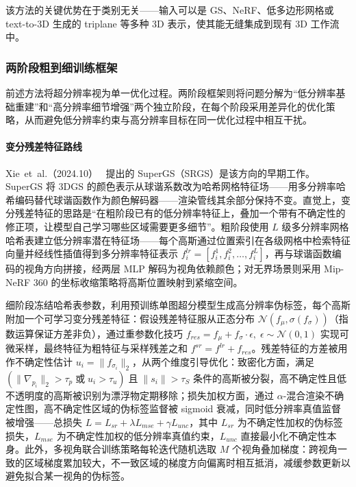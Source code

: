 该方法的关键优势在于类别无关——输入可以是 GS、NeRF、低多边形网格或 text-to-3D 生成的 triplane 等多种 3D 表示，使其能无缝集成到现有 3D 工作流中。

\subsubsection{两阶段粗到细训练框架}

前述方法将超分辨率视为单一优化过程。两阶段框架则将问题分解为“低分辨率基础重建”和“高分辨率细节增强”两个独立阶段，在每个阶段采用差异化的优化策略，从而避免低分辨率约束与高分辨率目标在同一优化过程中相互干扰。

\paragraph{变分残差特征路线}

Xie~et~al.（2024.10）~\cite{2410_02571} 提出的 SuperGS（SRGS）是该方向的早期工作。SuperGS 将 3DGS 的颜色表示从球谐系数改为哈希网格特征场——用多分辨率哈希编码替代球谐函数作为颜色解码器——渲染管线其余部分保持不变。直觉上，变分残差特征的思路是“在粗阶段已有的低分辨率特征上，叠加一个带有不确定性的修正项，让模型自己学习哪些区域需要更多细节”。粗阶段使用 $L$ 级多分辨率网格哈希表建立低分辨率潜在特征场——每个高斯通过位置索引在各级网格中检索特征向量并经线性插值得到多分辨率特征表示 $f^{lr}_i = [f_i^1, f_i^2, \ldots, f_i^L]$，再与球谐函数编码的视角方向拼接，经两层 MLP 解码为视角依赖颜色；对无界场景则采用 Mip-NeRF 360 的坐标收缩策略将高斯位置映射到紧缩空间。

细阶段冻结哈希表参数，利用预训练单图超分模型生成高分辨率伪标签，每个高斯附加一个可学习变分残差特征：假设残差特征服从正态分布 $\mathcal{N}(f_\mu, \sigma(f_\sigma))$（指数运算保证方差非负），通过重参数化技巧 $f_{res} = f_\mu + f_\sigma \cdot \epsilon,\; \epsilon \sim \mathcal{N}(0,1)$ 实现可微采样，最终特征为粗特征与采样残差之和 $f^{sr} = f^{lr} + f_{res}$。残差特征的方差被用作不确定性估计 $u_i = \|f_{\sigma_i}\|_2$，从两个维度引导优化：致密化方面，满足 $(\|\nabla_{p_i}\|_2 > \tau_p \;\text{或}\; u_i > \tau_u) \;\text{且}\; \|s_i\| > \tau_S$ 条件的高斯被分裂，高不确定性且低不透明度的高斯被识别为漂浮物定期移除；损失加权方面，通过 $\alpha$-混合渲染不确定性图，高不确定性区域的伪标签监督被 sigmoid 衰减，同时低分辨率真值监督被增强——总损失 $L = L_{sr} + \lambda L_{mse} + \gamma L_{unc}$，其中 $L_{sr}$ 为不确定性加权的伪标签损失，$L_{mse}$ 为不确定性加权的低分辨率真值约束，$L_{unc}$ 直接最小化不确定性本身。此外，多视角联合训练策略每轮迭代随机选取 $M$ 个视角叠加梯度：跨视角一致的区域梯度累加较大，不一致区域的梯度方向偏离时相互抵消，减缓参数更新以避免拟合某一视角的伪标签。

